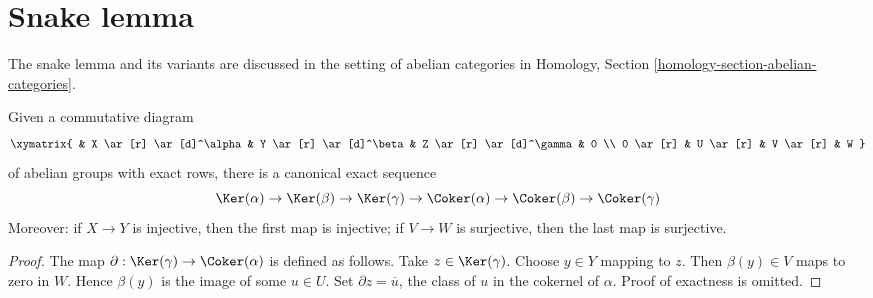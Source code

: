 \section{Snake lemma}
\label{section-snake}

\noindent
The snake lemma and its variants are discussed in the setting of
abelian categories in
Homology, Section \ref{homology-section-abelian-categories}.

\begin{lemma}
\label{lemma-snake}
\begin{reference}
\cite[III, Lemma 3.3]{Cartan-Eilenberg}
\end{reference}
Given a commutative diagram
$$
\xymatrix{
& X \ar[r] \ar[d]^\alpha &
Y \ar[r] \ar[d]^\beta &
Z \ar[r] \ar[d]^\gamma &
0 \\
0 \ar[r] & U \ar[r] & V \ar[r] & W
}
$$
of abelian groups with exact rows, there is a canonical exact sequence
$$
\Ker(\alpha) \to \Ker(\beta) \to \Ker(\gamma)
\to
\Coker(\alpha) \to \Coker(\beta) \to \Coker(\gamma)
$$
Moreover: if $X \to Y$ is injective, then the first map is
injective; if $V \to W$ is surjective, then the last
map is surjective.
\end{lemma}

\begin{proof}
The map $\partial : \Ker(\gamma) \to \Coker(\alpha)$ is defined
as follows. Take $z \in \Ker(\gamma)$. Choose $y \in Y$ mapping to $z$.
Then $\beta(y) \in V$ maps to zero in $W$. Hence $\beta(y)$ is the image of
some $u \in U$. Set $\partial z = \overline{u}$, the class of $u$ in the
cokernel of $\alpha$. Proof of exactness is omitted.
\end{proof}








